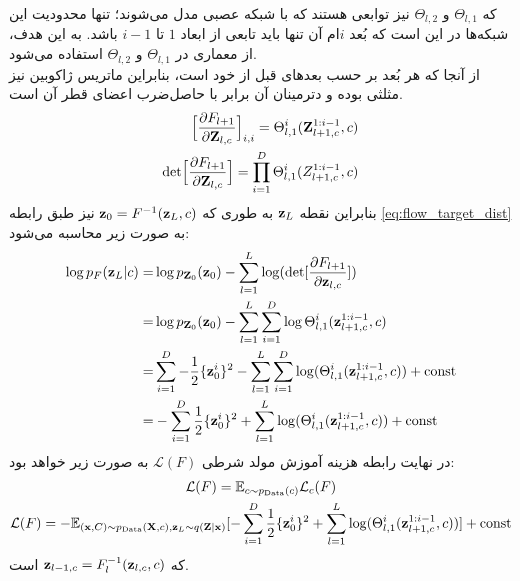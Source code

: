 که $\Theta_{l,1}$ و $\Theta_{l,2}$ نیز توابعی هستند که با شبکه عصبی مدل می‌شوند؛ تنها محدودیت این شبکه‌ها در این است که بُعد $i$ام آن تنها باید تابعی از ابعاد $1$ تا $i-1$ باشد. به این هدف، از معماری  در $\Theta_{l,1}$ و $\Theta_{l,2}$ استفاده می‌شود.
\\
از آنجا که هر بُعد بر حسب بعدهای قبل از خود است، بنابراین ماتریس ژاکوبین نیز مثلثی بوده و دترمینان آن برابر با حاصل‌ضرب اعضای قطر آن است.
\begin{align}
	\Big[ \frac{\partial F_{l+1}}{\partial {\bf Z}_{l,c}} \Big]_{i,i} = \Theta^{i}_{l,1}({\bf Z}^{1:i-1}_{l+1,c}, c) \nonumber
	\\
	\text{det}\Big[ \frac{\partial F_{l+1}}{\partial{\bf Z}_{l,c}} \Big] = \prod_{i=1}^D \Theta^{i}_{l,1}(Z^{1:i-1}_{l+1, c}, c)
\end{align}
بنابراین \likelihood{} نقطه ${\bf z}_L$ به طوری که 
${\bf z}_0 = F^{-1}({\bf z}_L, c)$
 نیز طبق رابطه \ref{eq:flow_target_dist} به صورت زیر محاسبه می‌شود:
\begin{align}
	\log p_F({\bf z}_L|c) = & \log p_{{\bf Z}_0}({\bf z}_0) - \sum_{l=1}^L \log (\text{det}[    \frac{\partial F_{l+1}}{\partial {\bf z}_{l,c}}     ]) \nonumber
	\\
	=               & \log p_{{\bf Z}_0}({\bf z}_0) - \sum_{l=1}^L \sum_{i=1}^D \log \Theta^{i}_{l,1}({\bf z}^{1:i-1}_{l+1, c}, c) \nonumber
	\\
	=               & \sum_{i=1}^D -\frac{1}{2} \{{\bf z}^i_0\}^2 - \sum_{l=1}^L \sum_{i=1}^D \log (\Theta^{i}_{l,1}({\bf z}^{1:i-1}_{l+1,c}, c)) + \text{const} \nonumber
	\\
	=               & -\sum_{i=1}^D \frac{1}{2} \{{\bf z}^i_0\}^2 + \sum_{l=1}^L \log (\Theta^{i}_{l,1}({\bf z}^{1:i-1}_{l+1,c}, c)) + \text{const}
\end{align}
در نهایت رابطه هزینه آموزش مولد شرطی $\mathcal{L} (F)$ به صورت زیر خواهد بود:
\begin{gather}
    \mathcal{L} (F) = \mathbb E_{c \sim p_\text{Data}(c)} \mathcal{L}_c (F) \nonumber 
    \\
    \mathcal{L} (F) = - \mathbb E_{({\bf x},C) \sim p_\text{Data}({\bf X},c), {\bf z}_L \sim q({\bf Z}|{\bf x})} [-\sum_{i=1}^D \frac{1}{2} \{{\bf z}^i_0\}^2 + \sum_{l=1}^L \log (\Theta^{i}_{l,1}({\bf z}^{1:i-1}_{l+1, c}, c))] + \text{const}
\end{gather}
که 
${\bf z}_{l-1,c} = F^{-1}_{l}({\bf z}_{l,c},c)$ است.

